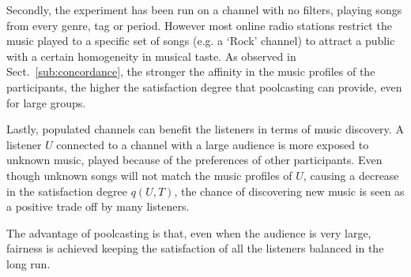 Secondly, the experiment has been run on a channel with no filters, playing songs from every genre, tag or period. 
However most online radio stations restrict the music played to a specific set of songs (e.g. a `Rock' channel) to attract a public with a certain homogeneity in musical taste. 
As observed in Sect.~\ref{sub:concordance}, the stronger the affinity in the music profiles of the participants, the higher the satisfaction degree that poolcasting can provide, even for large groups.


Lastly, populated channels can benefit the listeners in terms of music discovery.
A listener $U$ connected to a channel with a large audience is more exposed to unknown music, played because of the preferences of other participants. 
Even though unknown songs will not match the music profiles of $U$, causing a decrease in the satisfaction degree $q(U,T)$, the chance of discovering new music is seen as a positive trade off by many listeners.


The advantage of poolcasting is that, even when the audience is very large, fairness is achieved keeping the satisfaction of all the listeners balanced in the long run.


